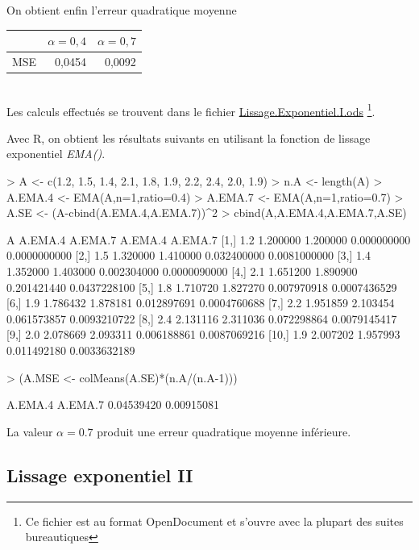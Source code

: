 \documentclass{article}
\begin{document}
On obtient enfin l'erreur quadratique moyenne\\

\begin{tabular}{|l|l|l|}
\hline
 & $\alpha=0,4$ & $\alpha=0,7$ \\ \hline
MSE & \multicolumn{1}{r|}{0,0454} & \multicolumn{1}{r|}{0,0092} \\ \hline
\end{tabular} \\

Les calculs effectués se trouvent dans le fichier \url{Lissage.Exponentiel.I.ods} \footnote{Ce fichier est au format OpenDocument et s'ouvre avec la plupart des suites bureautiques}.

Avec R, on obtient les résultats suivants en utilisant la fonction de lissage exponentiel \emph{EMA()}.

\begin{Schunk}
\begin{Sinput}
> A <- c(1.2, 1.5, 1.4, 2.1, 1.8, 1.9, 2.2, 2.4, 2.0, 1.9)
> n.A <- length(A)
> A.EMA.4 <- EMA(A,n=1,ratio=0.4)
> A.EMA.7 <- EMA(A,n=1,ratio=0.7)
> A.SE <- (A-cbind(A.EMA.4,A.EMA.7))^2
> cbind(A,A.EMA.4,A.EMA.7,A.SE)
\end{Sinput}
\begin{Soutput}
        A  A.EMA.4  A.EMA.7     A.EMA.4      A.EMA.7
 [1,] 1.2 1.200000 1.200000 0.000000000 0.0000000000
 [2,] 1.5 1.320000 1.410000 0.032400000 0.0081000000
 [3,] 1.4 1.352000 1.403000 0.002304000 0.0000090000
 [4,] 2.1 1.651200 1.890900 0.201421440 0.0437228100
 [5,] 1.8 1.710720 1.827270 0.007970918 0.0007436529
 [6,] 1.9 1.786432 1.878181 0.012897691 0.0004760688
 [7,] 2.2 1.951859 2.103454 0.061573857 0.0093210722
 [8,] 2.4 2.131116 2.311036 0.072298864 0.0079145417
 [9,] 2.0 2.078669 2.093311 0.006188861 0.0087069216
[10,] 1.9 2.007202 1.957993 0.011492180 0.0033632189
\end{Soutput}
\begin{Sinput}
> (A.MSE <- colMeans(A.SE)*(n.A/(n.A-1)))
\end{Sinput}
\begin{Soutput}
   A.EMA.4    A.EMA.7 
0.04539420 0.00915081 
\end{Soutput}
\end{Schunk}

La valeur $\alpha=0.7$ produit une erreur quadratique moyenne inférieure.

\subsection{Lissage exponentiel II}
\end{document}
